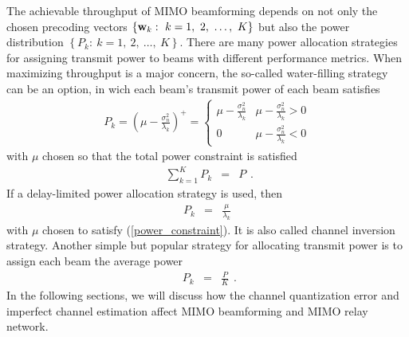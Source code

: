 \documentclass[conference]{IEEEtran}
\newcommand{\bw}{{\bf w}}
\begin{document}
The achievable throughput of MIMO beamforming depends on not only
the chosen precoding vectors $\left\{\bw_{k}:\ k=1,\ 2,\ \ldots,\
K\right\}$ but also the power distribution $\left\{P_{k}:\ k=1,\
2,\ \ldots,\ K\right\}$. There are many power allocation
strategies for assigning transmit power to beams with different
performance metrics. When maximizing throughput is a major
concern, the so-called water-filling strategy can be an option, in
wich each beam's transmit power of each beam satisfies
\begin{equation}
\begin{array}{l}
P_{k}=\left(\mu-\frac{\sigma_{n}^2}{\lambda_{k}}\right)^{+}=
\begin{cases}
\mu-\frac{\sigma_{n}^2}{\lambda_{k}} & \mu-\frac{\sigma_{n}^2}{\lambda_{k}} >0 \\
0 & \mu-\frac{\sigma_{n}^2}{\lambda_{k}} < 0
\end{cases}
\end{array}
\end{equation}
\noindent with $\mu$ chosen so that the total power constraint is
satisfied
\begin{equation}
\begin{array}{rcl}
\sum\limits_{k=1}^{K}P_{k}&=&P
\end{array}.\label{power_constraint}
\end{equation}
\noindent If a delay-limited power allocation strategy is used,
then
\begin{equation}
\begin{array}{rcl}
P_{k}&=&\frac{\mu}{\lambda_{k}}
\end{array}
\end{equation}
with $\mu$ chosen to satisfy (\ref{power_constraint}). It is also
called channel inversion strategy. Another simple but popular
strategy for allocating transmit power is to assign each beam the
average power
\begin{equation}
\begin{array}{rcl}
P_{k}&=&\frac{P}{K}
\end{array}.\label{P_aver}
\end{equation}
In the following sections, we will discuss how the channel
quantization error and imperfect channel estimation affect MIMO
beamforming and MIMO relay network.
\end{document}
